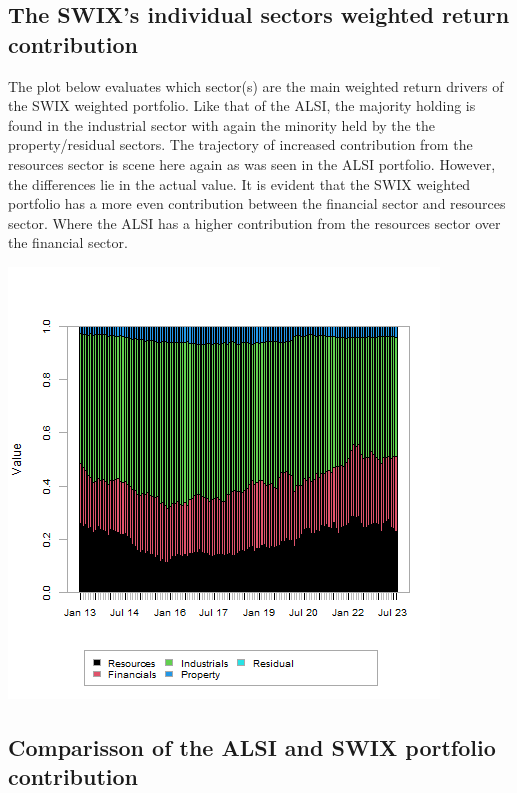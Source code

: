 \documentclass[11pt,preprint, authoryear]{elsarticle}
\let\origfigure\figure
\let\endorigfigure\endfigure
\renewenvironment{figure}[1][2] {
    \expandafter\origfigure\expandafter[H]
} {
    \endorigfigure
}
\numberwithin{equation}{section}
\numberwithin{figure}{section}
\numberwithin{table}{section}
\begin{document}
\hypertarget{the-swixs-individual-sectors-weighted-return-contribution}{%
\subsection{The SWIX's individual sectors weighted return
contribution}\label{the-swixs-individual-sectors-weighted-return-contribution}}

The plot below evaluates which sector(s) are the main weighted return
drivers of the SWIX weighted portfolio. Like that of the ALSI, the
majority holding is found in the industrial sector with again the
minority held by the the property/residual sectors. The trajectory of
increased contribution from the resources sector is scene here again as
was seen in the ALSI portfolio. However, the differences lie in the
actual value. It is evident that the SWIX weighted portfolio has a more
even contribution between the financial sector and resources sector.
Where the ALSI has a higher contribution from the resources sector over
the financial sector.

\begin{figure}[H]

{\centering \includegraphics{Question-3_files/figure-latex/Figure 3-1} 

}

\caption{SWIX sector contribution plot \label{Figure3}}\label{fig:Figure 3}
\end{figure}

\hypertarget{comparisson-of-the-alsi-and-swix-portfolio-contribution}{%
\subsection{Comparisson of the ALSI and SWIX portfolio
contribution}\label{comparisson-of-the-alsi-and-swix-portfolio-contribution}}
\end{document}
